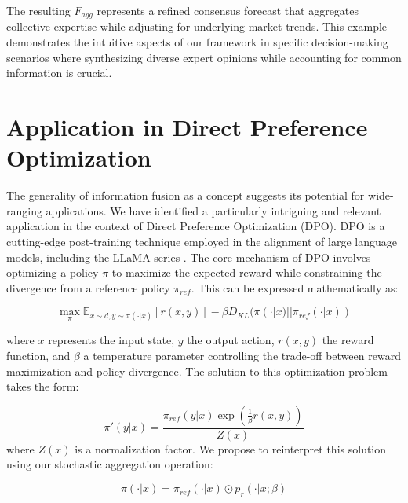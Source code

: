 \documentclass[letterpaper]{article} %
\theoremstyle{definition}
\theoremstyle{remark}
\begin{document}
The resulting $F_{agg}$ represents a refined consensus forecast that aggregates collective expertise while adjusting for underlying market trends. This example demonstrates the intuitive aspects of our framework in specific decision-making scenarios where synthesizing diverse expert opinions while accounting for common information is crucial.

\section{Application in Direct Preference Optimization}



The generality of information fusion as a concept suggests its potential for wide-ranging applications. We have identified a particularly intriguing and relevant application in the context of Direct Preference Optimization (DPO). DPO is a cutting-edge post-training technique employed in the alignment of large language models, including the LLaMA series \cite{rafailov2024direct}. The core mechanism of DPO involves optimizing a policy $\pi$ to maximize the expected reward while constraining the divergence from a reference policy $\pi_{ref}$. This can be expressed mathematically as:

\begin{equation}
    \max_{\pi} \mathbb{E}_{x \sim d, y \sim \pi(\cdot|x)}[r(x, y)] - \beta D_{KL}(\pi(\cdot|x) || \pi_{ref}(\cdot|x))
\end{equation}

where $x$ represents the input state, $y$ the output action, $r(x,y)$ the reward function, and $\beta$ a temperature parameter controlling the trade-off between reward maximization and policy divergence. The solution to this optimization problem takes the form:

\begin{equation}
    \pi'(y|x) = \frac{\pi_{ref}(y|x) \exp(\frac{1}{\beta} r(x, y))}{Z(x)}
\end{equation}
where $Z(x)$ is a normalization factor. We propose to reinterpret this solution using our stochastic aggregation operation:

\begin{equation}
    \pi(\cdot|x) = \pi_{ref}(\cdot|x) \odot p_r(\cdot|x;\beta)
\end{equation}
\end{document}
